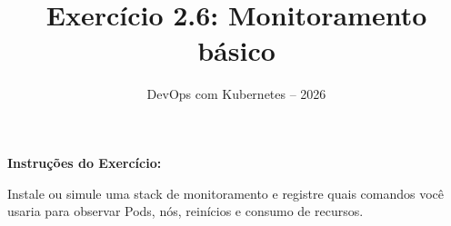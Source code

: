 \documentclass[11pt,a4paper]{article}
\title{\color{secondary}\Huge\textbf{Exercício 2.6: Monitoramento básico}}
\author{\color{primary}DevOps com Kubernetes -- 2026}
\date{}
\begin{document}
\maketitle


\textbf{Instruções do Exercício:}

\begin{tcolorbox}[colback=blue!5!white,colframe=blue!75!black]
Instale ou simule uma stack de monitoramento e registre quais comandos você usaria para observar Pods, nós, reinícios e consumo de recursos.
\end{tcolorbox}
\end{document}
